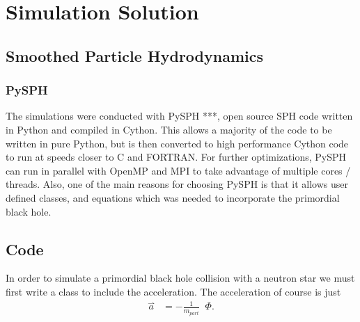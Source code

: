 \documentclass[12pt]{report}
\DeclareMathOperator{\grad}{\overset{\rightharpoonup}\nabla}
\begin{document}
\doublespacing
\linespread{2}
\lstset{style=mystyle}

\chapter{Simulation Solution}

\section{Smoothed Particle Hydrodynamics}

\subsection{PySPH}
The simulations were conducted with PySPH ***, open source SPH code written in Python and compiled in Cython. This allows a majority of the code to be written in pure Python, but is then converted to high performance Cython code to run at speeds closer to C and FORTRAN. For further optimizations, PySPH can run in parallel with OpenMP and MPI to take advantage of multiple cores / threads. Also, one of the main reasons for choosing PySPH is that it allows user defined classes, and equations which was needed to incorporate the primordial black hole.

\section{Code}

In order to simulate a primordial black hole collision with a neutron star we must first write a class to include the acceleration. The acceleration of course is just
\begin{align*}
\overset{\rightharpoonup}a &= - \frac{1}{m_{part}} \grad \Phi.
\end{align*}
\end{document}
